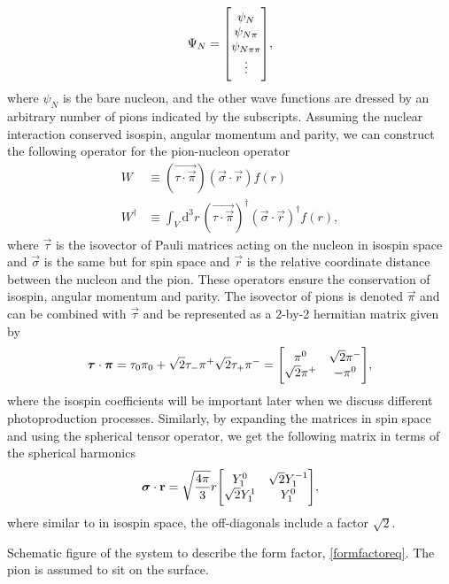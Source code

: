 \begin{equation} \label{superposition}
	\Psi_N = \mqty[\psi_{N} \\
	\psi_{N\pi} \\
	\psi_{N\pi\pi}\\
	\vdots],
\end{equation}
where $\psi_{N}$ is the bare nucleon, and the other wave functions are dressed by an arbitrary number of pions indicated by the subscripts. Assuming the nuclear interaction conserved isospin, angular momentum and parity, we can construct the following operator for the pion-nucleon operator
\begin{align} \label{W}
	W & \equiv (\vec{\tau\cdot\vec{\pi}})(\vec{\sigma}\cdot\vec{r})f(r) \\
	W^\dagger & \equiv  \int_V \text{d}^3 r \, (\vec{\tau\cdot\vec{\pi}})^\dagger (\vec{\sigma}\cdot\vec{r})^\dagger f(r) \label{Wdagger},
\end{align}
where $\vec{\tau}$ is the isovector of Pauli matrices acting on the nucleon in isospin space and $\vec{\sigma}$ is the same but for spin space and $\vec{r}$ is the relative coordinate distance between the nucleon and the pion. These operators ensure the conservation of isospin, angular momentum and parity. The isovector of pions is denoted $\vec{\pi}$ and can be combined with $\vec{\tau}$ and be represented as a 2-by-2 hermitian matrix given by
\begin{equation} \label{isocoeff}
	\vec{\tau}\cdot \vec{\pi} = \tau_0  \pi_0+ \sqrt{2} \tau_{-}\pi^ +\sqrt{2}\tau_{+} \pi^{-} = \mqty[\pi^0 & \sqrt{2}\pi^- \\
	\sqrt{2}\pi^+ & -\pi^0],
\end{equation}
where the isospin coefficients will be important later when we discuss different photoproduction processes. Similarly, by expanding the matrices in spin space and using the spherical tensor operator, we get the following matrix in terms of the spherical harmonics
\begin{equation}\label{spinmatrix}
	\vec{\sigma}\cdot \vec{r} = \sqrt{\frac{4\pi}{3}} r \mqty[Y_{1}^0 & \sqrt{2}Y_1^{-1} \\ \sqrt{2}Y_1^1 & Y_1^0],
\end{equation}
where similar to in isospin space, the off-diagonals include a factor $\sqrt{2}$.  
\begin{marginfigure}
	\centering
	
	\caption{Schematic figure of the system to describe the form factor, \eqref{formfactoreq}. The pion is assumed to sit on the surface.}
	\label{formfactor}
\end{marginfigure}
